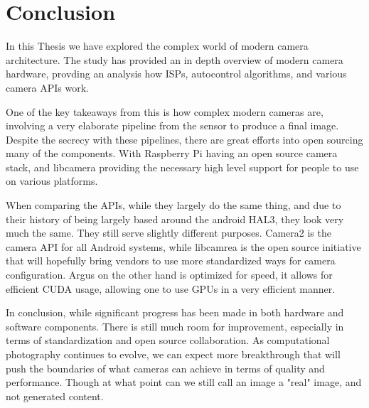 \chapter{Conclusion\label{section:conclusions}}
In this Thesis we have explored the complex world of modern camera architecture.
The study has provided an in depth overview of modern camera hardware, provding
an analysis how ISPs, autocontrol algorithms, and various camera APIs work.

One of the key takeaways from this is how complex modern cameras are, involving
a very elaborate pipeline from the sensor to produce a final image.
Despite the secrecy with these pipelines, there are great efforts into open
sourcing many of the components. With Raspberry Pi having an open source camera
stack, and libcamera providing the necessary high level support for people to
use on various platforms.

When comparing the APIs, while they largely do the same thing, and due to their
history of being largely based around the android HAL3, they look very much the
same. They still serve slightly different purposes. Camera2 is the camera API
for all Android systems, while libcamrea is the open source initiative that
will hopefully bring vendors to use more standardized ways for camera
configuration. Argus on the other hand is optimized for speed, it allows for
efficient CUDA usage, allowing one to use GPUs in a very efficient manner.

In conclusion, while significant progress has been made in both hardware and
software components. There is still much room for improvement, especially in
terms of standardization and open source collaboration. As computational
photography continues to evolve, we can expect more breakthrough that will
push the boundaries of what cameras can achieve in terms of quality and
performance. Though at what point can we still call an image a "real" image,
and not generated content.
